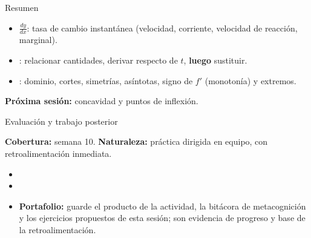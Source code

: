 \documentclass[10pt,aspectratio=169]{beamer}
\begin{document}
\begin{frame}{Resumen}
  \begin{itemize}
    \item $\frac{dy}{dx}$: tasa de cambio instantánea (velocidad, corriente, velocidad de reacción, marginal).
    \item {}: relacionar cantidades, derivar respecto de $t$, \textbf{luego} sustituir.
    \item {}: dominio, cortes, simetrías, asíntotas, signo de $f'$ (monotonía) y extremos.
  \end{itemize}
  \vspace{3mm}
  \textbf{Próxima sesión:} concavidad y puntos de inflexión.
\end{frame}


\begin{frame}{Evaluación y trabajo posterior}
  \small
  \begin{evalbox}
    \textbf{Cobertura:} semana 10. \textbf{Naturaleza:} práctica dirigida en equipo, con retroalimentación inmediata.
  \end{evalbox}
  \begin{itemize}
    \item \criterios
    \item \declaracionia
    \item \textbf{Portafolio:} guarde el producto de la actividad, la bitácora de metacognición y los ejercicios propuestos de esta sesión; son evidencia de progreso y base de la retroalimentación.
  \end{itemize}
\end{frame}
\end{document}

